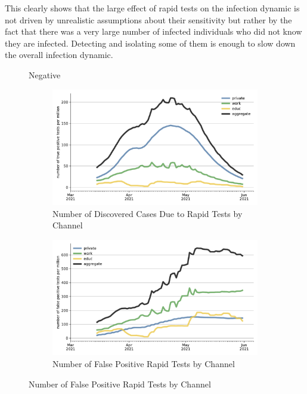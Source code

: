 This clearly shows that the large effect of rapid tests on the infection dynamic is not
driven by unrealistic assumptions about their sensitivity but rather by the fact that
there was a very large number of infected individuals who did not know they are
infected. Detecting and isolating some of them is enough to slow down the overall
infection dynamic.

\begin{figure}   %
   Negative
   \centering
   \begin{subfigure}[b]{0.425\textwidth}
      \centering
      \includegraphics[width=\textwidth]{figures/results/figures/rapid_test_statistics/number_true_positive}
      \caption{Number of Discovered Cases Due to Rapid Tests by Channel}
      \label{fig:rapid_tests_number_true_positive}
   \end{subfigure}
   \hfill
   \begin{subfigure}[b]{0.425\textwidth}
      \centering
      \includegraphics[width=\textwidth]{figures/results/figures/rapid_test_statistics/number_false_positive}
      \caption{Number of False Positive Rapid Tests by Channel}

\end{subfigure}
\end{figure}
